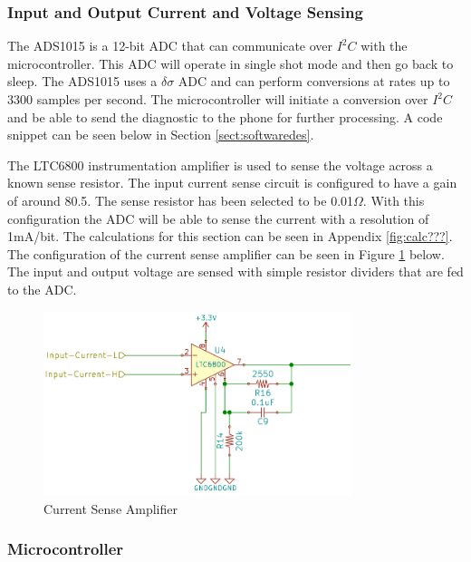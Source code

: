 \documentclass{article}
\numberwithin{figure}{section}
\numberwithin{equation}{section}
\begin{document}
{\subsubsection{Input and Output Current and Voltage Sensing}

The ADS1015 is a 12-bit ADC that can communicate over $I^2 C$ with the microcontroller. This ADC will operate in single shot mode and then go back to sleep. The ADS1015 uses a $\delta\sigma$ ADC and can perform conversions at rates up to 3300 samples per second. The microcontroller will initiate a conversion over $I^2 C$ and be able to send the diagnostic to the phone for further processing. A code snippet can be seen below in Section \ref{sect:softwaredes}.

The LTC6800 instrumentation amplifier is used to sense the voltage across a known sense resistor. The input current sense circuit is configured to have a gain of around 80.5. The sense resistor has been selected to be 0.01$\Omega$. With this configuration the ADC will be able to sense the current with a resolution of 1mA/bit. The calculations for this section can be seen in Appendix \ref{fig:calc???}. The configuration of the current sense amplifier can be seen in Figure \ref{fig:AV} below. The input and output voltage are sensed with simple resistor dividers that are fed to the ADC.
\begin{figure}[H]
	\centering
	\includegraphics[width=0.8\textwidth]{AtoV}
	\caption{Current Sense Amplifier}
	\label{fig:AV}
\end{figure}

\subsubsection{Microcontroller}

}
\end{document}
